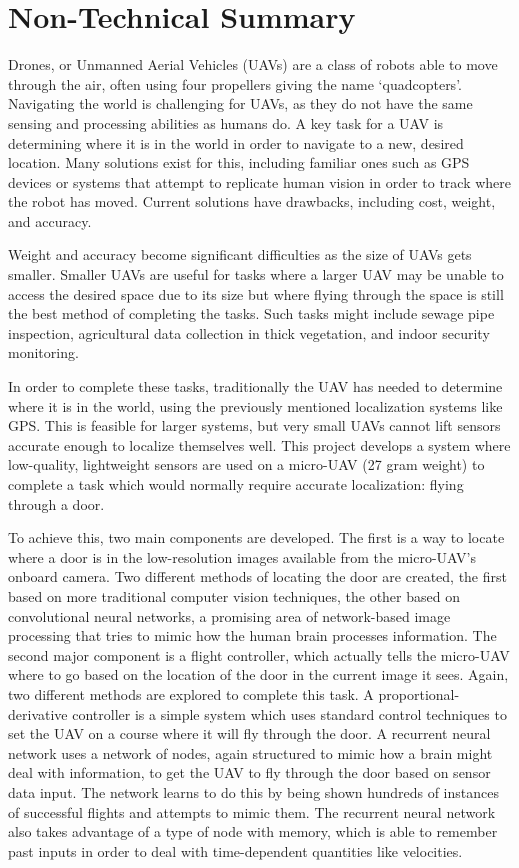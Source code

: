 \section{Non-Technical Summary}
Drones, or Unmanned Aerial Vehicles (UAVs) are a class of robots able to move through the air, often using four propellers giving the name `quadcopters'. Navigating the world is challenging for UAVs, as they do not have the same sensing and processing abilities as humans do. A key task for a UAV is determining where it is in the world in order to navigate to a new, desired location. Many solutions exist for this, including familiar ones such as GPS devices or systems that attempt to replicate human vision in order to track where the robot has moved. Current solutions have drawbacks, including cost, weight, and accuracy. 

Weight and accuracy become significant difficulties as the size of UAVs gets smaller. Smaller UAVs are useful for tasks where a larger UAV may be unable to access the desired space due to its size but where flying through the space is still the best method of completing the tasks. Such tasks might include sewage pipe inspection, agricultural data collection in thick vegetation, and indoor security monitoring. 

In order to complete these tasks, traditionally the UAV has needed to determine where it is in the world, using the previously mentioned localization systems like GPS. This is feasible for larger systems, but very small UAVs cannot lift sensors accurate enough to localize themselves well. This project develops a system where low-quality, lightweight sensors are used on a micro-UAV (27 gram weight) to complete a task which would normally require accurate localization: flying through a door.

To achieve this, two main components are developed. The first is a way to locate where a door is in the low-resolution images available from the micro-UAV's onboard camera. Two different methods of locating the door are created, the first based on more traditional computer vision techniques, the other based on convolutional neural networks, a promising area of network-based image processing that tries to mimic how the human brain processes information. The second major component is a flight controller, which actually tells the micro-UAV where to go based on the location of the door in the current image it sees. Again, two different methods are explored to complete this task. A proportional-derivative controller is a simple system which uses standard control techniques to set the UAV on a course where it will fly through the door. A recurrent neural network uses a network of nodes, again structured to mimic how a brain might deal with information, to get the UAV to fly through the door based on sensor data input. The network learns to do this by being shown hundreds of instances of successful flights and attempts to mimic them. The recurrent neural network also takes advantage of a type of node with memory, which is able to remember past inputs in order to deal with time-dependent quantities like velocities. 

